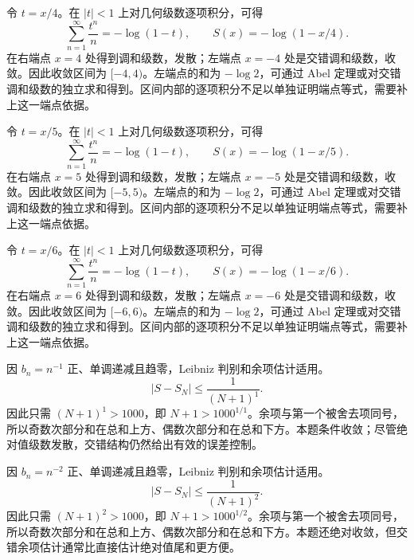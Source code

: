 \documentclass[UTF8,12pt,a4paper,fontset=fandol]{ctexart}
\begin{document}
\begin{solve}\label{ans:c26q17}
令 $t=x/4$。在 $|t|<1$ 上对几何级数逐项积分，可得
\[
\sum_{n=1}^\infty\frac{t^n}n=-\log(1-t),\qquad S(x)=-\log(1-x/4).
\]
在右端点 $x=4$ 处得到调和级数，发散；左端点 $x=-4$ 处是交错调和级数，收敛。因此收敛区间为 $[-4,4)$。左端点的和为 $-\log2$，可通过 Abel 定理或对交错调和级数的独立求和得到。区间内部的逐项积分不足以单独证明端点等式，需要补上这一端点依据。
\end{solve}

\begin{solve}\label{ans:c26q18}
令 $t=x/5$。在 $|t|<1$ 上对几何级数逐项积分，可得
\[
\sum_{n=1}^\infty\frac{t^n}n=-\log(1-t),\qquad S(x)=-\log(1-x/5).
\]
在右端点 $x=5$ 处得到调和级数，发散；左端点 $x=-5$ 处是交错调和级数，收敛。因此收敛区间为 $[-5,5)$。左端点的和为 $-\log2$，可通过 Abel 定理或对交错调和级数的独立求和得到。区间内部的逐项积分不足以单独证明端点等式，需要补上这一端点依据。
\end{solve}

\begin{solve}\label{ans:c26q19}
令 $t=x/6$。在 $|t|<1$ 上对几何级数逐项积分，可得
\[
\sum_{n=1}^\infty\frac{t^n}n=-\log(1-t),\qquad S(x)=-\log(1-x/6).
\]
在右端点 $x=6$ 处得到调和级数，发散；左端点 $x=-6$ 处是交错调和级数，收敛。因此收敛区间为 $[-6,6)$。左端点的和为 $-\log2$，可通过 Abel 定理或对交错调和级数的独立求和得到。区间内部的逐项积分不足以单独证明端点等式，需要补上这一端点依据。
\end{solve}

\begin{solve}\label{ans:c26q20}
因 $b_n=n^{-1}$ 正、单调递减且趋零，Leibniz 判别和余项估计适用。
\[
|S-S_N|\le\frac1{(N+1)^{1}}.
\]
因此只需 $(N+1)^{1}>1000$，即 $N+1>1000^{1/1}$。余项与第一个被舍去项同号，所以奇数次部分和在总和上方、偶数次部分和在总和下方。本题条件收敛；尽管绝对值级数发散，交错结构仍然给出有效的误差控制。
\end{solve}

\begin{solve}\label{ans:c26q21}
因 $b_n=n^{-2}$ 正、单调递减且趋零，Leibniz 判别和余项估计适用。
\[
|S-S_N|\le\frac1{(N+1)^{2}}.
\]
因此只需 $(N+1)^{2}>1000$，即 $N+1>1000^{1/2}$。余项与第一个被舍去项同号，所以奇数次部分和在总和上方、偶数次部分和在总和下方。本题还绝对收敛，但交错余项估计通常比直接估计绝对值尾和更方便。
\end{solve}
\end{document}

